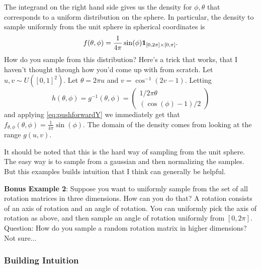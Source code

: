 The integrand on the right hand side gives us the density for $\phi, \theta$ that corresponds to a uniform distribution on the sphere. In particular, the density to sample uniformly from the unit sphere in spherical coordinates is
$$
f(\theta, \phi) = \frac{1}{4\pi}\sin(\phi){\bf 1}_{[0, 2\pi]\times [0, \pi]}.
$$
How do you sample from this distribution? Here's a trick that works, that I haven't thought through how you'd come up with from scratch. Let $u,v\sim U([0,1]^2)$. Let $\theta = 2\pi u$ and $v = \cos^{-1}(2v-1)$. Letting
$$
h(\theta, \phi) = g^{-1}(\theta, \phi) = 
\begin{pmatrix}
1/2\pi \theta\\
(\cos(\phi) - 1)/2
\end{pmatrix}
$$ and 
applying \eqref{eq:pushforwardY} we immediately get that $f_{\theta, \phi}(\theta, \phi) = \frac{1}{4\pi}\sin(\phi)$. The domain of the density comes from looking at the range $g(u, v)$. 

It should be noted that this is the hard way of sampling from the unit sphere. The easy way is to sample from a gaussian and then normalizing the samples. But this examples builds intuition that I think can generally be helpful. 

\textbf{Bonus Example 2}: 
Suppose you want to uniformly sample from the set of all rotation matrices in three dimensions. How can you do that? A rotation consists of an axis of rotation and an angle of rotation. You can uniformly pick the axis of rotation as above, and then sample an angle of rotation uniformly from $[0, 2\pi]$. Question: How do you sample a random rotation matrix in higher dimensions? Not sure...


\vspace{1em}
\subsubsection{Building Intuition}

